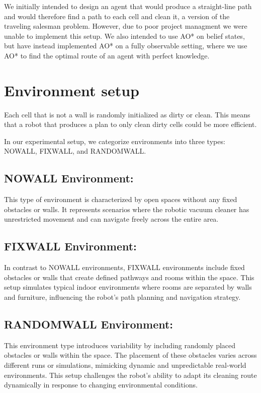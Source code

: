 \documentclass{article}
\begin{document}
We initially intended to design an agent that would produce a straight-line path and would therefore find a path to each cell and clean it, a version of the traveling salesman problem. However, due to poor project managment we were unable to implement this setup. We also intended to use AO* on belief states, but have instead implemented AO* on a fully observable setting, where we use AO* to find the optimal route of an agent with perfect knowledge.


\section{Environment setup}
Each cell that is not a wall is randomly initialized as dirty or clean. This means that a robot that produces a plan to only clean dirty cells could be more efficient.

In our experimental setup, we categorize environments into three types: NOWALL, FIXWALL, and RANDOMWALL.

\subsection{NOWALL Environment:} This type of environment is characterized by open spaces without any fixed obstacles or walls. It represents scenarios where the robotic vacuum cleaner has unrestricted movement and can navigate freely across the entire area.

\subsection{FIXWALL Environment:} In contrast to NOWALL environments, FIXWALL environments include fixed obstacles or walls that create defined pathways and rooms within the space. This setup simulates typical indoor environments where rooms are separated by walls and furniture, influencing the robot's path planning and navigation strategy.

\subsection{RANDOMWALL Environment:} This environment type introduces variability by including randomly placed obstacles or walls within the space. The placement of these obstacles varies across different runs or simulations, mimicking dynamic and unpredictable real-world environments. This setup challenges the robot's ability to adapt its cleaning route dynamically in response to changing environmental conditions.
\end{document}
